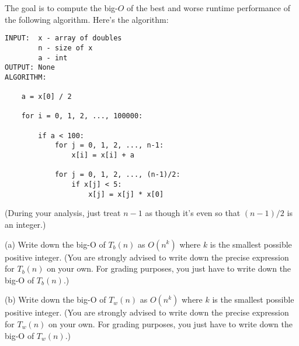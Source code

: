 The goal is to compute the big-$O$ of the best and worse
runtime performance
of the following algorithm. 
Here's the algorithm:
\begin{Verbatim}[frame=single]
INPUT:  x - array of doubles
        n - size of x
        a - int
OUTPUT: None
ALGORITHM:

    a = x[0] / 2                               

    for i = 0, 1, 2, ..., 100000:

        if a < 100:
            for j = 0, 1, 2, ..., n-1:
                x[i] = x[i] + a                

            for j = 0, 1, 2, ..., (n-1)/2:
                if x[j] < 5:                   
                    x[j] = x[j] * x[0]         

\end{Verbatim}

(During your analysis, just treat $n - 1$ as though it's even so that 
$(n - 1)/2$ is an integer.)

(a) Write down the big-O of $T_b(n)$ as $O(n^k)$
where $k$ is the smallest possible positive integer.
(You are strongly advised to write down the precise expression
for $T_b(n)$ on your own. 
For grading purposes, you just have to write down the big-O of $T_b(n)$.)

(b) Write down the big-O of $T_w(n)$ as $O(n^k)$
where $k$ is the smallest possible positive integer.
(You are strongly advised to write down the precise expression
for $T_w(n)$ on your own. 
For grading purposes, you just have to write down the big-O of $T_w(n)$.)


